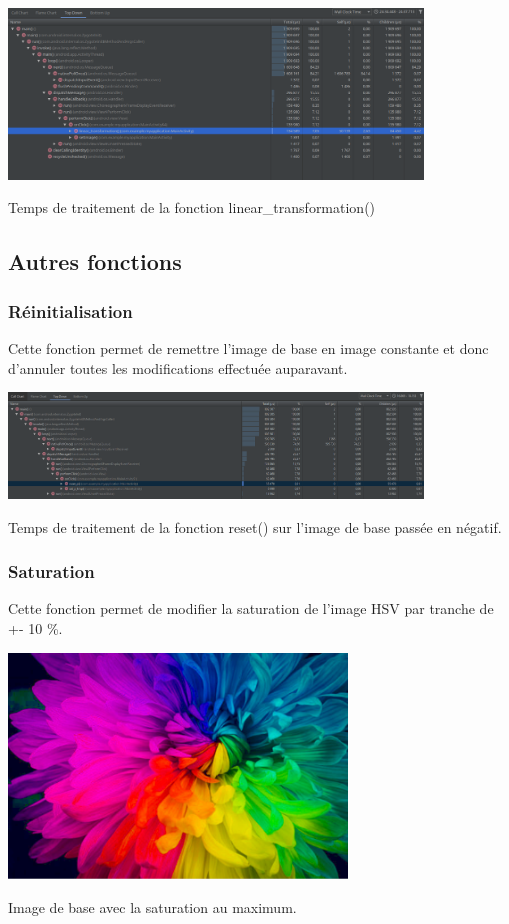 \documentclass{article}
\begin{document}
\begin{center} 
    \includegraphics[width=11cm]{../Image_temps/TempsLinearTransformation}

    Temps de traitement de la fonction linear\_transformation()
\end{center}
\bigbreak

\subsection{Autres fonctions}

\subsubsection{Réinitialisation}
Cette fonction permet de remettre l'image de base en image constante et donc d'annuler toutes les modifications effectuée auparavant.
\bigbreak

\begin{center} 
    \includegraphics[width=11cm]{../Image_temps/TempsReset}

    Temps de traitement de la fonction reset() sur l'image de base passée en négatif.
\end{center}
\bigbreak

\subsubsection{Saturation}
Cette fonction permet de modifier la saturation de l'image HSV par tranche de +- 10 \%.
\bigbreak

\begin{center} 
    \includegraphics[width=9cm]{../Image_fonctions/SaturationMax}

    Image de base avec la saturation au maximum.
\end{center}
\bigbreak
\end{document}
